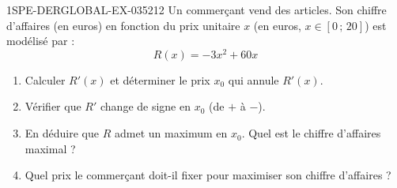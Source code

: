 \begin{exercice}{1SPE-DERGLOBAL-EX-035}{2}{12}
Un commerçant vend des articles. Son chiffre d'affaires (en euros) en fonction du prix unitaire $x$ (en euros, $x \in [0\,;\,20]$) est modélisé par :
\[
R(x) = -3x^2 + 60x
\]

\begin{enumerate}
\item Calculer $R'(x)$ et déterminer le prix $x_0$ qui annule $R'(x)$.
\item Vérifier que $R'$ change de signe en $x_0$ (de $+$ à $-$).
\item En déduire que $R$ admet un maximum en $x_0$. Quel est le chiffre d'affaires maximal ?
\item Quel prix le commerçant doit-il fixer pour maximiser son chiffre d'affaires ?
\end{enumerate}
\end{exercice}

